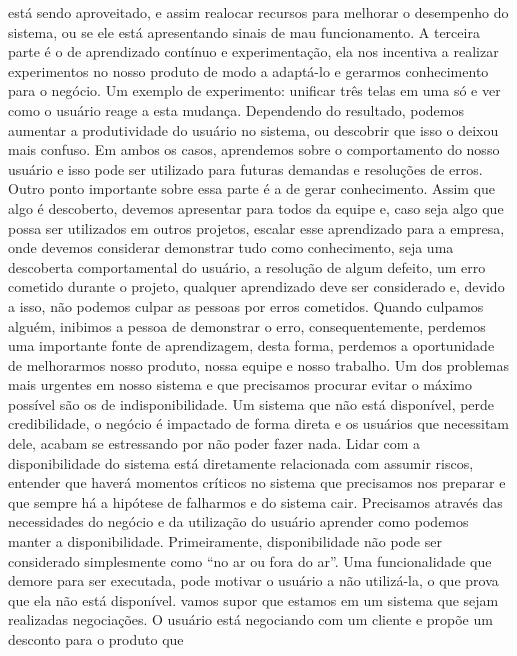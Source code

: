     está sendo aproveitado, e assim realocar recursos para melhorar o desempenho
    do sistema, ou se ele está apresentando sinais de mau funcionamento. A terceira
    parte é o de aprendizado contínuo e experimentação, ela nos incentiva a realizar
    experimentos no nosso produto de modo a adaptá-lo e gerarmos conhecimento para
    o negócio. Um exemplo de experimento: unificar três telas em uma só e ver como
    o usuário reage a esta mudança. Dependendo do resultado, podemos aumentar a
    produtividade do usuário no sistema, ou descobrir que isso o deixou mais
    confuso. Em ambos os casos, aprendemos sobre o comportamento do nosso usuário
    e isso pode ser utilizado para futuras demandas e resoluções de erros. Outro
    ponto importante sobre essa parte é a de gerar conhecimento. Assim que algo
    é descoberto, devemos apresentar para todos da equipe e, caso seja algo que
    possa ser utilizados em outros projetos, escalar esse aprendizado para a
    empresa, onde devemos considerar demonstrar tudo como conhecimento, seja uma
    descoberta comportamental do usuário, a resolução de algum defeito, um erro
    cometido durante o projeto, qualquer aprendizado deve ser considerado e,
    devido a isso, não podemos culpar as pessoas por erros cometidos. Quando
    culpamos alguém, inibimos a pessoa de demonstrar o erro, consequentemente,
    perdemos uma importante fonte de aprendizagem, desta forma, perdemos a
    oportunidade de melhorarmos nosso produto, nossa equipe e nosso trabalho. \newline
    Um dos problemas mais urgentes em nosso sistema e que precisamos procurar evitar
    o máximo possível são os de indisponibilidade. Um sistema que não está disponível,
    perde credibilidade, o negócio é impactado de forma direta e os usuários que
    necessitam dele, acabam se estressando por não poder fazer nada. Lidar com a
    disponibilidade do sistema está diretamente relacionada com assumir riscos,
    entender que haverá momentos críticos no sistema que precisamos nos preparar e
    que sempre há a hipótese de falharmos e do sistema cair. Precisamos através das
    necessidades do negócio e da utilização do usuário aprender como podemos manter
    a disponibilidade. Primeiramente, disponibilidade não pode ser considerado
    simplesmente como “no ar ou fora do ar”. Uma funcionalidade que demore para ser
    executada, pode motivar o usuário a não utilizá-la, o que prova que ela não está
    disponível. vamos supor que estamos em um sistema que sejam realizadas negociações.
    O usuário está negociando com um cliente e propõe um desconto para o produto que
